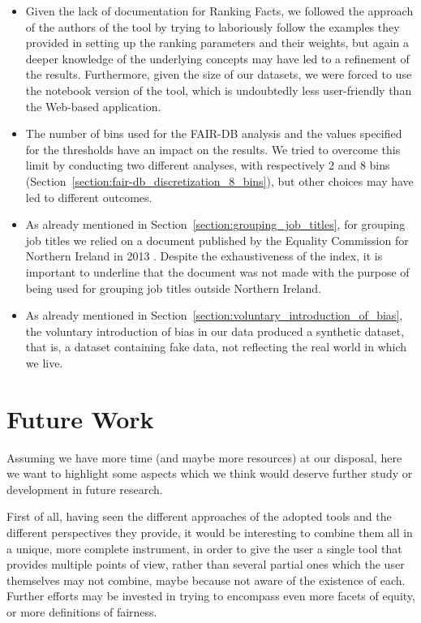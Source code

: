 \begin{itemize}
\item Given the lack of documentation for Ranking Facts, we followed the approach of the authors of the tool by trying to laboriously follow the examples they provided in setting up the ranking parameters and their weights, but again a deeper knowledge of the underlying concepts may have led to a refinement of the results. Furthermore, given the size of our datasets, we were forced to use the notebook version of the tool, which is undoubtedly less user-friendly than the Web-based application.
\item The number of bins used for the FAIR-DB analysis and the values specified for the thresholds have an impact on the results. We tried to overcome this limit by conducting two different analyses, with respectively 2 and 8 bins (Section~\ref{section:fair-db_discretization_8_bins}), but other choices may have led to different outcomes.
\item As already mentioned in Section~\ref{section:grouping_job_titles}, for grouping job titles we relied on a document published by the Equality Commission for Northern Ireland in 2013 \cite{equality2013index}. Despite the exhaustiveness of the index, it is important to underline that the document was not made with the purpose of being used for grouping job titles outside Northern Ireland.
\item As already mentioned in Section~\ref{section:voluntary_introduction_of_bias}, the voluntary introduction of bias in our data produced a synthetic dataset, that is, a dataset containing fake data, not reflecting the real world in which we live.
\end{itemize}


\section{Future Work}
Assuming we have more time (and maybe more resources) at our disposal, here we want to highlight some aspects which we think would deserve further study or development in future research.

First of all, having seen the different approaches of the adopted tools and the different perspectives they provide, it would be interesting to combine them all in a unique, more complete instrument, in order to give the user a single tool that provides multiple points of view, rather than several partial ones which the user themselves may not combine, maybe because not aware of the existence of each. Further efforts may be invested in trying to encompass even more facets of equity, or more definitions of fairness.

